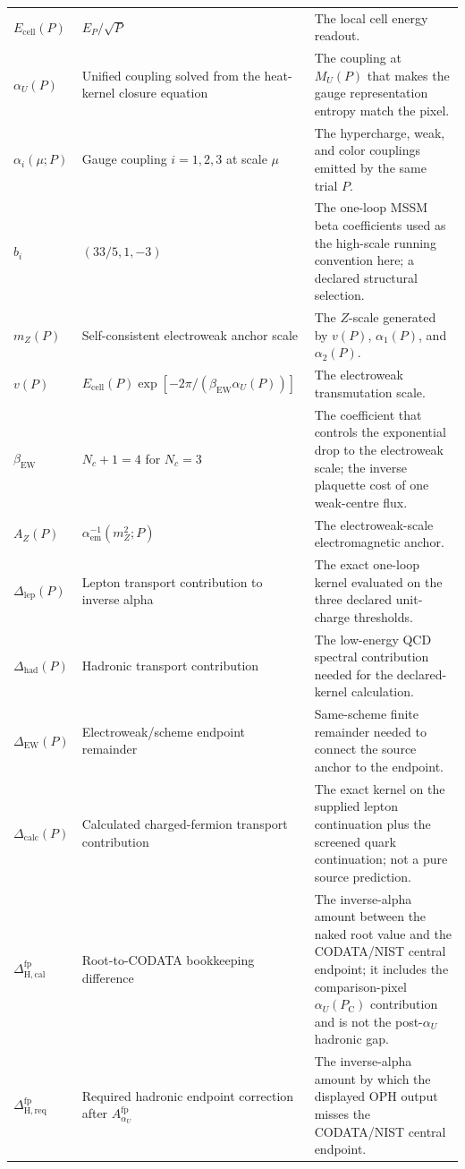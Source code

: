 \documentclass[11pt]{article}
\theoremstyle{remark}
\newcommand{\AZ}{A_Z}
\newcommand{\Ppub}{P_{\mathrm C}}
\newcommand{\Dcalc}{\Delta_{\mathrm{calc}}}
\newcommand{\Dcalib}{\Delta_{\mathrm{H,cal}}}
\newcommand{\Dlep}{\Delta_{\mathrm{lep}}}
\newcommand{\Dhad}{\Delta_{\mathrm{had}}}
\newcommand{\DEW}{\Delta_{\mathrm{EW}}}
\newcommand{\Dhadreq}{\Delta_{\mathrm{H,req}}}
\newcommand{\Nc}{N_c}
\begin{document}
\begin{longtable}{@{}L{0.20\textwidth}L{0.32\textwidth}L{0.38\textwidth}@{}}
\(E_{\mathrm{cell}}(P)\) & \(E_P/\sqrt P\) & The local cell energy readout. \\
\(\alpha_U(P)\) & Unified coupling solved from the heat-kernel closure equation & The coupling at \(M_U(P)\) that makes the gauge representation entropy match the pixel. \\
\(\alpha_i(\mu;P)\) & Gauge coupling \(i=1,2,3\) at scale \(\mu\) & The hypercharge, weak, and color couplings emitted by the same trial \(P\). \\
\(b_i\) & \((33/5,1,-3)\) & The one-loop MSSM beta coefficients used as the high-scale running convention here; a declared structural selection. \\
\(m_Z(P)\) & Self-consistent electroweak anchor scale & The \(Z\)-scale generated by \(v(P)\), \(\alpha_1(P)\), and \(\alpha_2(P)\). \\
\(v(P)\) & \(E_{\mathrm{cell}}(P)\exp[-2\pi/(\beta_{\mathrm{EW}}\alpha_U(P))]\) & The electroweak transmutation scale. \\
\(\beta_{\mathrm{EW}}\) & \(\Nc+1=4\) for \(\Nc=3\) & The coefficient that controls the exponential drop to the electroweak scale; the inverse plaquette cost of one weak-centre flux. \\
\(\AZ(P)\) & \(\alpha_{\mathrm{em}}^{-1}(m_Z^2;P)\) & The electroweak-scale electromagnetic anchor. \\
\(\Dlep(P)\) & Lepton transport contribution to inverse alpha & The exact one-loop kernel evaluated on the three declared unit-charge thresholds. \\
\(\Dhad(P)\) & Hadronic transport contribution & The low-energy QCD spectral contribution needed for the declared-kernel calculation. \\
\(\DEW(P)\) & Electroweak/scheme endpoint remainder & Same-scheme finite remainder needed to connect the source anchor to the endpoint. \\
\(\Dcalc(P)\) & Calculated charged-fermion transport contribution & The exact kernel on the supplied lepton continuation plus the screened quark continuation; not a pure source prediction. \\
\(\Dcalib^{\mathrm{fp}}\) & Root-to-CODATA bookkeeping difference & The inverse-alpha amount between the naked root value and the CODATA/NIST central endpoint; it includes the comparison-pixel \(\alpha_U(\Ppub)\) contribution and is not the post-\(\alpha_U\) hadronic gap. \\
\(\Dhadreq^{\mathrm{fp}}\) & Required hadronic endpoint correction after \(A_{\alpha_U}^{\mathrm{fp}}\) & The inverse-alpha amount by which the displayed OPH output misses the CODATA/NIST central endpoint. \\

\end{longtable}
\end{document}
